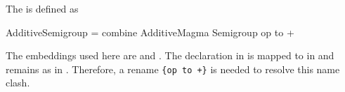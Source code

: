 The  is defined as 
\begin{togcode} 
AdditiveSemigroup = combine AdditiveMagma {} Semigroup {op to +} 
\end{togcode} 
The embeddings used here are  and . The declaration  in  is mapped to \lstmath{+} in  and remains as  in . Therefore, a rename \lstinline|{op to +}| is needed to resolve this name clash. 

